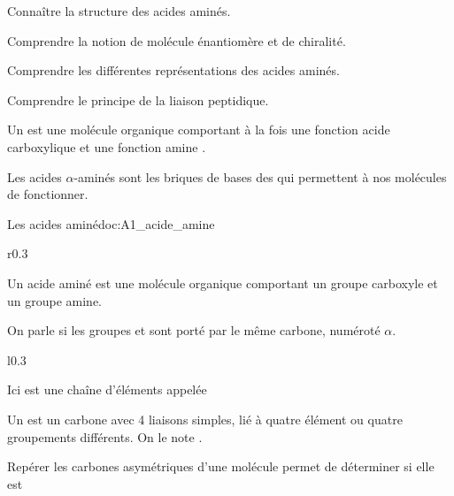 \teteTermStssBiom

\vspace*{-40pt}

\begin{objectifs}
  \item Connaître la structure des acides aminés.
  \item Comprendre la notion de molécule énantiomère et de chiralité.
  \item Comprendre les différentes représentations des acides aminés.
  \item Comprendre le principe de la liaison peptidique.
\end{objectifs}

\begin{contexte}
  Un  est une molécule organique comportant à la fois une fonction acide carboxylique  et une fonction amine .

  Les acides $\alpha$-aminés sont les briques de bases des  qui permettent à nos molécules de fonctionner. 
  
\end{contexte}


\begin{doc}{Les acides aminé}{doc:A1_acide_amine}
  \begin{wrapfigure}[3]{r}{0.3\linewidth}
    \centering
    \vspace*{-24pt}
  \end{wrapfigure}
  Un acide aminé est une molécule organique comportant un groupe carboxyle et un groupe amine.

  \begin{importants}
    On parle  si les groupes  et  sont porté par le même carbone, numéroté $\alpha$.
  \end{importants}
  
  \begin{wrapfigure}{l}{0.3\linewidth}
    \centering
    \vspace*{-10pt}
  \end{wrapfigure}

  Ici  est une chaîne d'éléments appelée 
  
  \begin{importants}  
    Un  est un carbone avec 4 liaisons simples, lié à quatre élément ou quatre groupements différents.
    On le note .
  \end{importants}

  Repérer les carbones asymétriques d'une molécule permet de déterminer si elle est 
\end{doc}

